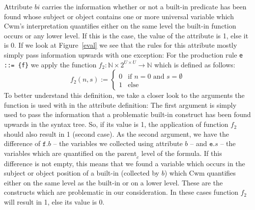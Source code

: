 Attribute $bi$ carries the information whether or not a built-in predicate has been found whose subject or object contains one or more universal variable which Cwm's 
interpretation quantifies either on the same level the built-in function occurs or any lower level. If this is the case, the value of the attribute is 1, else it is 0.
If we look at Figure~\ref{eval} we see that the rules for this attribute mostly simply pass information upwards with one exception: For the production rule 
\texttt{e ::= \{f\}} we apply the function $f_2:  \mathbb{N}\times 2^{U\times U}\rightarrow \mathbb{N}$ which is defined as follows:
% 
% 
\[
 f_2 (n, s) := \begin{cases} 0 &\text{if } n=0 \text{ and } s=\emptyset\\ 1 & \text{else}\end{cases} 
\]
To better understand this definition, we take a closer look to the arguments the function is used with in the attribute definition: The first argument is simply used 
to pass the information that a problematic built-in construct has been found upwards in the syntax tree. So, if its value is 1, the application of function 
$f_2$ should also result in 1 (second case). As the second argument, we have the difference of $\texttt{f}.b$ -- the variables we collected using attribute $b$ -- and $\texttt{e}.s$
-- the variables which are quantified on the $\text{parent}_c$ level of the formula.  If this difference is not empty, this means that we found a variable 
which occurs in the subject or object position of a built-in (collected by $b$) which Cwm quantifies either on the same level as the built-in or on a lower level. 
These are the constructs which are problematic in our consideration. In these cases function $f_2$ will result in 1, else its value is 0.

